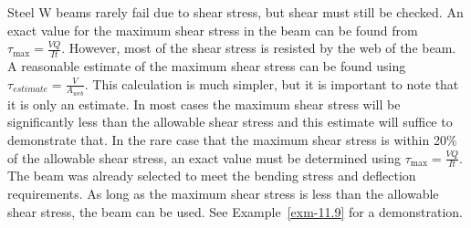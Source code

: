 \documentclass[
  letterpaper,
  DIV=11,
  numbers=noendperiod]{scrreprt}
\theoremstyle{definition}
\theoremstyle{remark}
\begin{document}
Steel W beams rarely fail due to shear stress, but shear must still be
checked. An exact value for the maximum shear stress in the beam can be
found from \(\tau_{\max }=\frac{V Q}{I t}\). However, most of the shear
stress is resisted by the web of the beam. A reasonable estimate of the
maximum shear stress can be found using
\(\tau_{estimate}=\frac{V}{A_{web}}\). This calculation is much simpler,
but it is important to note that it is only an estimate. In most cases
the maximum shear stress will be significantly less than the allowable
shear stress and this estimate will suffice to demonstrate that. In the
rare case that the maximum shear stress is within 20\% of the allowable
shear stress, an exact value must be determined using
\(\tau_{\max }=\frac{V Q}{I t}\). The beam was already selected to meet
the bending stress and deflection requirements. As long as the maximum
shear stress is less than the allowable shear stress, the beam can be
used. See Example~\ref{exm-11.9} for a demonstration.
\end{document}

